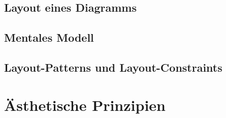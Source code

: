 \subsection{Layout eines Diagramms}




\subsection{Mentales Modell}
\label{subsec:mental-map}

\cite{Branke01Dynamic} 

\subsection{Layout-Patterns und Layout-Constraints}

% 

\section{Ästhetische Prinzipien}
\label{sec:aesthetics-criteria}





